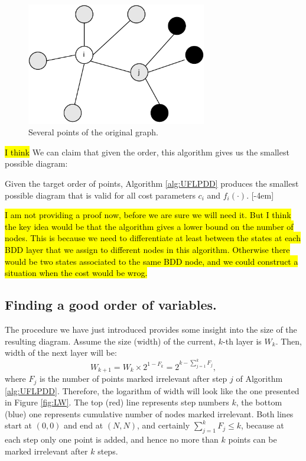 \documentclass[11pt]{article}
\begin{document}
  \begin{figure}%
    \centering
    \includegraphics[width=0.7\textwidth]{./img/Ns.pdf}%
    \caption{Several points of the original graph.}\label{fig:Ns}%
\end{figure}

\hl{I think} We can claim that given the order, this algorithm gives us the smallest
possible diagram:

\begin{proposition}
Given the target order of points, Algorithm \ref{alg:UFLPDD} produces the smallest
possible diagram that is valid for all cost parameters \(c_i\) and \(f_i(\cdot)\).
[-4em]
\label{prop:bestDD}
\end{proposition}

\hl{I am not providing a proof now, before we are sure we will need it.
But I think the key idea would be that the algorithm gives a lower bound on the
number of nodes. This is because we need to differentiate at least between the
states at each BDD layer that we assign to different nodes in this algorithm.
Otherwise there would be two states associated to the same BDD node, and we
could construct a situation when the cost would be wrog.}

\subsection{Finding a good order of variables.}
\label{sec:org75483d8}
The procedure we have just introduced provides some insight into the size of the
resulting diagram. Assume the size (width) of the current, $k$-th
layer is \(W_k\). Then, width of the next layer will be:
\[ W_{k+1} = W_k \times 2^{1 - F_k} = 2^{k - \sum_{j=1}^k F_j}, \]
where \(F_j\) is the number of points marked irrelevant after step \(j\) of
Algorithm \ref{alg:UFLPDD}. Therefore, the logarithm of width will look like the
one presented in Figure \ref{fig:LW}. The top (red) line represents step numbers
\(k\), the bottom (blue) one represents cumulative number of nodes marked
irrelevant. Both lines start at \((0,0)\) and end at \((N, N)\), and certainly
\(\sum_{j=1}^k F_j \leq k\), because at each step only one point is added, and
hence no more than \(k\) points can be marked irrelevant after \(k\) steps.
\end{document}
